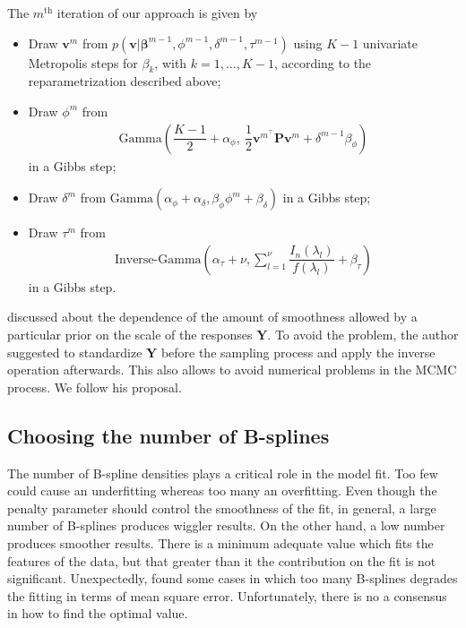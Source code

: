 \documentclass[aps,reprint,amsmath,amssymb,showpacs,showkeys]{revtex4-1}%
\begin{document}
The $m^{\text{th}}$ iteration of our approach is given by
\begin{itemize}
	\item Draw $\bm{v}^{m}$ from $p(\bm{v}|\bm{\beta}^{m-1},\phi^{m-1},\delta^{m-1},\tau^{m-1})$ using $K-1$ univariate Metropolis steps for $\beta_k$, with $k=1,\dots,K-1$, according to the reparametrization described above;
	\item Draw $\phi^{m}$ from 
	\begin{align*}
	\text{Gamma}\!\left(\dfrac{K-1}{2}\!+\!\alpha_{\phi},\: \dfrac{1}{2} \bm{v}^{m^\top} \textbf{P} \bm{v}^{m}\!+\!\delta^{m-1} \beta_{\phi} \right)
	\end{align*}
	 in a Gibbs step;
	\item Draw $\delta^{m}$ from $\text{Gamma}\left(\alpha_{\phi} + \alpha_{\delta}, \beta_{\phi} \phi^{m} + \beta_{\delta}\right)$ in a Gibbs step;
	\item Draw $\tau^{m}$ from 
	\begin{align*}
	\text{Inverse-Gamma}\!\left(\alpha_{\tau}\!+\!\nu, \sum_{l=1}^{\nu} \dfrac{I_n(\lambda_l)}{f(\lambda_l)} + \beta_{\tau} \right) 
	\end{align*}
	in a Gibbs step.
\end{itemize}

\cite{Ruppert2002} discussed about the dependence of the amount of smoothness allowed by a particular prior on the scale of the responses $\bm{Y}$.  To avoid the problem, the author suggested to standardize $\bm{Y}$ before the sampling process and apply the inverse operation afterwards.  This also allows to avoid numerical problems in the MCMC process.  We follow his proposal.

\subsection*{Choosing the number of B-splines}

The number of B-spline densities plays a critical role in the model fit.  Too few could cause an underfitting whereas too many an overfitting.  Even though the penalty parameter should control the smoothness of the fit, in general, a large number of B-splines produces wiggler results.  On the other hand, a low number produces smoother results.  There is a minimum adequate value which fits the features of the data, but that greater than it the contribution on the fit is not significant.  Unexpectedly, \cite{Ruppert2002} found some cases in which too many B-splines degrades the fitting in terms of mean square error.  Unfortunately, there is no a consensus in how to find the optimal value.  
\end{document}
